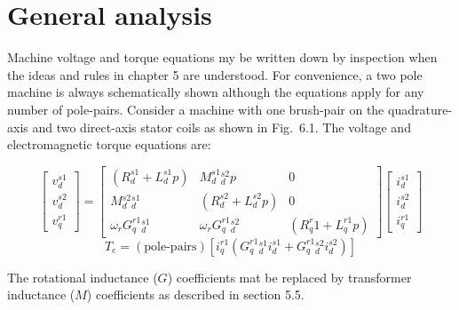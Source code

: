 \documentclass[a4paper,numbers=noenddot,12pt]{scrbook}
\begin{document}
        \section{General analysis}
        Machine voltage and torque equations my be written down by inspection when the ideas and rules in chapter 5 are understood. For convenience, a two pole machine is always schematically shown although the equations apply for any number of pole-pairs.
        Consider a machine with one brush-pair on the quadrature-axis and two direct-axis stator coils as shown in Fig.\ 6.1. The voltage and electromagnetic torque equations are:

        \begin{equation}
            \begin{bmatrix}
                v_d^{s1}\\[2ex] v_d^{s2}\\[2ex] v_q^{r1}
            \end{bmatrix} =
            \begin{bmatrix}
                (R_d^{s1} + L_d^{s1}p) & M_{d}^{s1}{}_{d}^{s2} p & 0 \\[2ex]
                M{_d^{s2}{}_d^{s1}} & (R_d^{s2} + L_d^{s2}p) & 0 \\[2ex]
                \omega_r G_{q}^{r1}{}_d^{s1} & \omega_r G_{q}^{r1}{}_d^{s2} & (R_q^r1{} + L_q^{r1}p)
            \end{bmatrix}
            \begin{bmatrix}
                i_d^{s1} \\[2ex] i_d^{s2} \\[2ex] i_q^{r1}
            \end{bmatrix}
            \label{}
        \end{equation}
        \begin{equation}
            T_e = (\text{pole-pairs})[i_q^{r1}(G_q^{r1}{}_d^{s1} i_d^{s1} + G_q^{r1}{}_d^{s2} i_d^{s2})]
            \label{}
        \end{equation}

        The rotational inductance ($G$) coefficients mat be replaced by transformer inductance ($M$) coefficients as described in section 5.5.
\end{document}
